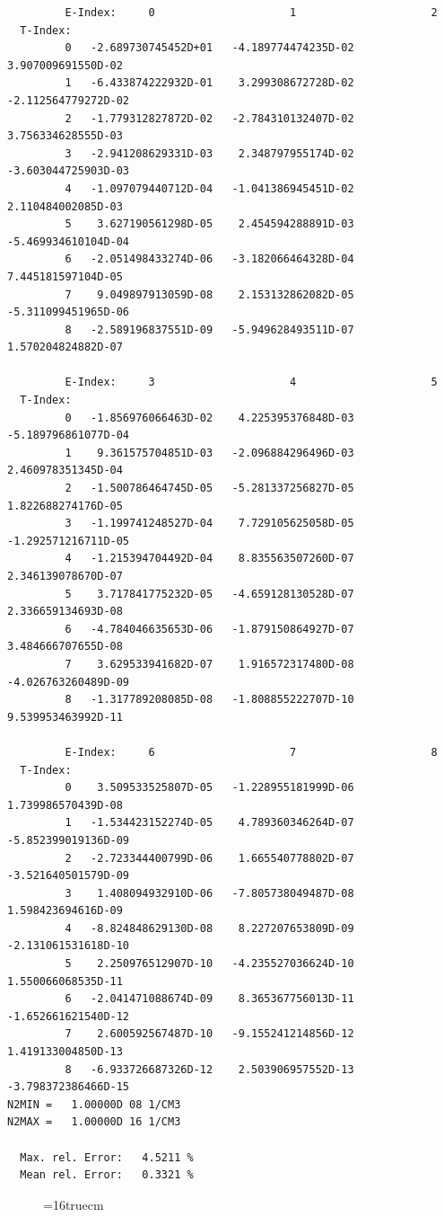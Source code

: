 \documentclass[12pt,dvipdfmx]{article}
\begin{document}
\begin{small}\begin{verbatim}
         E-Index:     0                     1                     2
  T-Index:
         0   -2.689730745452D+01   -4.189774474235D-02    3.907009691550D-02
         1   -6.433874222932D-01    3.299308672728D-02   -2.112564779272D-02
         2   -1.779312827872D-02   -2.784310132407D-02    3.756334628555D-03
         3   -2.941208629331D-03    2.348797955174D-02   -3.603044725903D-03
         4   -1.097079440712D-04   -1.041386945451D-02    2.110484002085D-03
         5    3.627190561298D-05    2.454594288891D-03   -5.469934610104D-04
         6   -2.051498433274D-06   -3.182066464328D-04    7.445181597104D-05
         7    9.049897913059D-08    2.153132862082D-05   -5.311099451965D-06
         8   -2.589196837551D-09   -5.949628493511D-07    1.570204824882D-07

         E-Index:     3                     4                     5
  T-Index:
         0   -1.856976066463D-02    4.225395376848D-03   -5.189796861077D-04
         1    9.361575704851D-03   -2.096884296496D-03    2.460978351345D-04
         2   -1.500786464745D-05   -5.281337256827D-05    1.822688274176D-05
         3   -1.199741248527D-04    7.729105625058D-05   -1.292571216711D-05
         4   -1.215394704492D-04    8.835563507260D-07    2.346139078670D-07
         5    3.717841775232D-05   -4.659128130528D-07    2.336659134693D-08
         6   -4.784046635653D-06   -1.879150864927D-07    3.484666707655D-08
         7    3.629533941682D-07    1.916572317480D-08   -4.026763260489D-09
         8   -1.317789208085D-08   -1.808855222707D-10    9.539953463992D-11

         E-Index:     6                     7                     8
  T-Index:
         0    3.509533525807D-05   -1.228955181999D-06    1.739986570439D-08
         1   -1.534423152274D-05    4.789360346264D-07   -5.852399019136D-09
         2   -2.723344400799D-06    1.665540778802D-07   -3.521640501579D-09
         3    1.408094932910D-06   -7.805738049487D-08    1.598423694616D-09
         4   -8.824848629130D-08    8.227207653809D-09   -2.131061531618D-10
         5    2.250976512907D-10   -4.235527036624D-10    1.550066068535D-11
         6   -2.041471088674D-09    8.365367756013D-11   -1.652661621540D-12
         7    2.600592567487D-10   -9.155241214856D-12    1.419133004850D-13
         8   -6.933726687326D-12    2.503906957552D-13   -3.798372386466D-15
N2MIN =   1.00000D 08 1/CM3
N2MAX =   1.00000D 16 1/CM3

  Max. rel. Error:   4.5211 %
  Mean rel. Error:   0.3321 %

\end{verbatim}\end{small}
\begin{figure} \label{2.3.2B1}
\epsfxsize=16truecm
\end{figure}
\newpage
\end{document}
